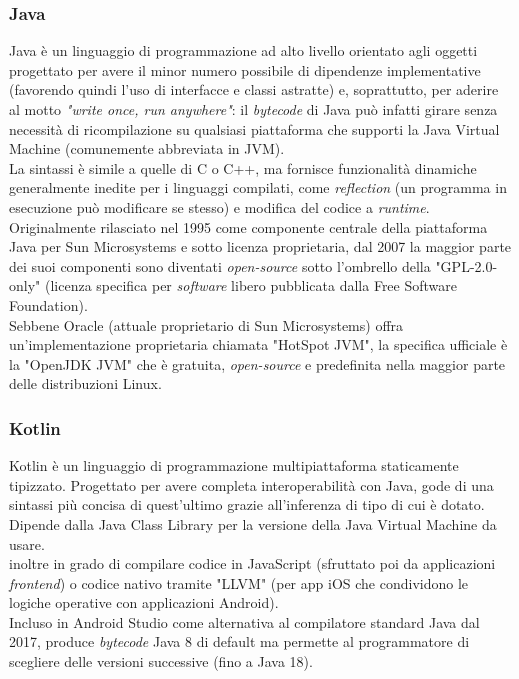 \subsubsection{Java}
Java è un linguaggio di programmazione ad alto livello orientato agli oggetti progettato per avere il minor numero possibile di dipendenze implementative (favorendo quindi l'uso di interfacce e classi astratte) e, soprattutto, per aderire al motto \textit{"write once, run anywhere"}: il \textit{bytecode} di Java può infatti girare senza necessità di ricompilazione su qualsiasi piattaforma che supporti la Java Virtual Machine (comunemente abbreviata in JVM).\\  
La sintassi è simile a quelle di C o C++, ma fornisce funzionalità dinamiche generalmente inedite per i linguaggi compilati, come \textit{reflection} (un programma in esecuzione può modificare se stesso) e modifica del codice a \textit{runtime}.\\
Originalmente rilasciato nel 1995 come componente centrale della piattaforma Java per Sun Microsystems e sotto licenza proprietaria, dal 2007 la maggior parte dei suoi componenti sono diventati \textit{open-source} sotto l'ombrello della "GPL-2.0-only" (licenza specifica per \textit{software} libero pubblicata dalla Free Software Foundation).\\
Sebbene Oracle (attuale proprietario di Sun Microsystems) offra un'implementazione proprietaria chiamata "HotSpot JVM", la specifica ufficiale è la "OpenJDK JVM" che è gratuita, \textit{open-source} e predefinita nella maggior parte delle distribuzioni Linux.

\subsubsection{Kotlin}
Kotlin è un linguaggio di programmazione multipiattaforma staticamente tipizzato. Progettato per avere completa interoperabilità con Java, gode di una sintassi più concisa di quest'ultimo grazie all'inferenza di tipo di cui è dotato. Dipende dalla Java Class Library per la versione della Java Virtual Machine da usare.\\
\e{} inoltre in grado di compilare codice in JavaScript (sfruttato poi da applicazioni \textit{frontend}) o codice nativo tramite "LLVM" (per app iOS che condividono le logiche operative con applicazioni Android).\\
Incluso in Android Studio come alternativa al compilatore standard Java dal 2017, produce \textit{bytecode} Java 8 di default ma permette al programmatore di scegliere delle versioni successive (fino a Java 18).

